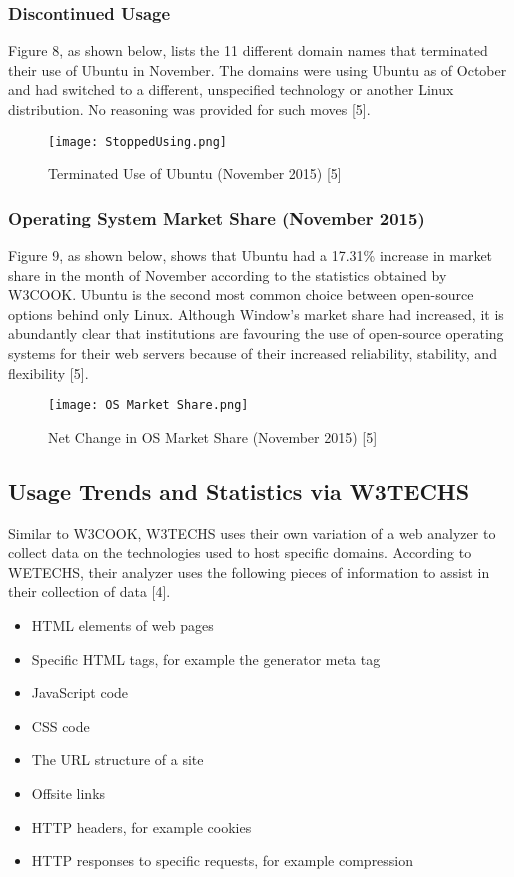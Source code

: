 \documentclass[11pt]{article}
\newcommand{\forceindent}{\leavevmode{\parindent=1em\indent}}
\begin{document}
\subsubsection{Discontinued Usage}

\forceindent Figure 8, as shown below, lists the 11 different domain names that terminated their use of Ubuntu in November. The domains were using Ubuntu as of October and had switched to a different, unspecified technology or another Linux distribution. No reasoning was provided for such moves [5].\\

\begin{figure}[h!]
  \centering
    \caption{Terminated Use of Ubuntu (November 2015) [5]}
{\texttt{[image: StoppedUsing.png]}}
\end{figure}

\subsubsection{Operating System Market Share (November 2015)}

\forceindent Figure 9, as shown below, shows that Ubuntu had a 17.31\% increase in market share in the month of November according to the statistics obtained by W3COOK. Ubuntu is the second most common choice between open-source options behind only Linux. Although Window's market share had increased, it is abundantly clear that institutions are favouring the use of open-source operating systems for their web servers because of their increased reliability, stability, and flexibility [5].\\

\begin{figure}[h!]
  \centering
    \caption{Net Change in OS Market Share (November 2015) [5]}
{\texttt{[image: OS Market Share.png]}}
\end{figure}

\subsection{Usage Trends and Statistics via W3TECHS}

\forceindent Similar to W3COOK, W3TECHS uses their own variation of a web analyzer to collect data on the technologies used to host specific domains. According to WETECHS, their analyzer uses the following pieces of information to assist in their collection of data [4].
\begin{itemize}
\item HTML elements of web pages
\item Specific HTML tags, for example the generator meta tag
\item JavaScript code
\item CSS code
\item The URL structure of a site
\item Offsite links
\item HTTP headers, for example cookies
\item HTTP responses to specific requests, for example compression 
\end{itemize}
\end{document}

